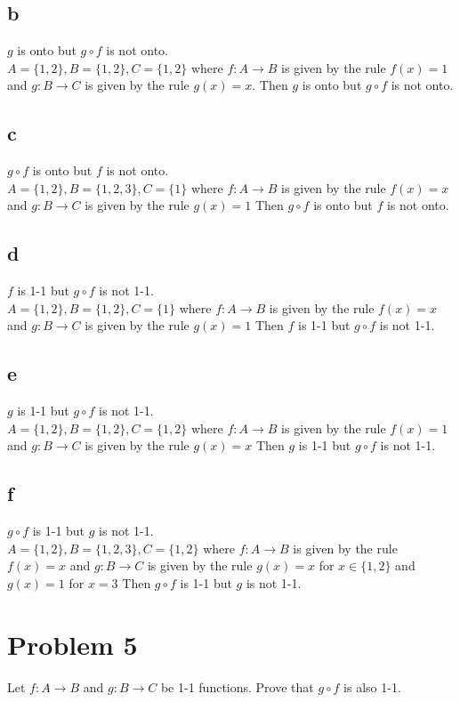 \documentclass{article}
\begin{document}
\subsection*{b}
$g$ is onto but $g \circ f$ is not onto.\\
$A = \{1, 2\}, B = \{1,2\}, C = \{1,2\} $ where $f: A \rightarrow B$ is given by the rule $f(x) = 1$ and $g: B \rightarrow C$ is given by the rule $g(x) = x$. Then $g$ is onto but $g \circ f$ is not onto.
\subsection*{c}
$g \circ f$ is onto but $f$ is not onto.\\
$A = \{1, 2\}, B = \{1,2,3\}, C = \{1\} $ where $f: A \rightarrow B$ is given by the rule $f(x) = x$ and $g: B \rightarrow C$ is given by the rule $g(x) = 1$ Then $g \circ f$ is onto but $f$ is not onto.
\subsection*{d}
$f$ is 1-1 but $g \circ f$ is not 1-1.\\
$A = \{1, 2\}, B = \{1,2\}, C = \{1\} $ where $f: A \rightarrow B$ is given by the rule $f(x) = x$ and $g: B \rightarrow C$ is given by the rule $g(x) = 1$ Then $f$ is 1-1 but $g \circ f$ is not 1-1.
\subsection*{e}
$g$ is 1-1 but $g \circ f$ is not 1-1.\\
$A = \{1, 2\}, B = \{1,2\}, C = \{1, 2\} $ where $f: A \rightarrow B$ is given by the rule $f(x) = 1$ and $g: B \rightarrow C$ is given by the rule $g(x) = x$ Then $g$ is 1-1 but $g \circ f$ is not 1-1.
\subsection*{f}
$g \circ f$ is 1-1 but $g$ is not 1-1.\\
$A = \{1, 2\}, B = \{1,2,3\}, C = \{1,2 \}$ where $f: A \rightarrow B$ is given by the rule $f(x) = x$ and $g: B \rightarrow C$ is given by the rule $g(x) = x$ for $x \in \{1,2\}$ and $g(x) = 1$ for $x = 3$ Then $g \circ f$ is 1-1 but $g$ is not 1-1.

\section*{Problem 5}
Let $f : A \rightarrow B$ and $g : B \rightarrow C$ be 1-1 functions. Prove that $g \circ f$ is also 1-1.
\end{document}
